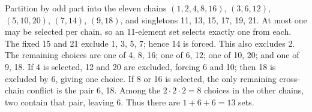 Partition by odd part into the eleven chains $(1,2,4,8,16)$, $(3,6,12)$, $(5,10,20)$, $(7,14)$, $(9,18)$, and singletons 11, 13, 15, 17, 19, 21. At most one may be selected per chain, so an 11-element set selects exactly one from each. The fixed 15 and 21 exclude 1, 3, 5, 7; hence 14 is forced. This also excludes 2. The remaining choices are one of 4, 8, 16; one of 6, 12; one of 10, 20; and one of 9, 18. If 4 is selected, 12 and 20 are excluded, forcing 6 and 10; then 18 is excluded by 6, giving one choice. If 8 or 16 is selected, the only remaining cross-chain conflict is the pair 6, 18. Among the $2\cdot2\cdot2=8$ choices in the other chains, two contain that pair, leaving 6. Thus there are $1+6+6=\boxed{13}$ sets.

